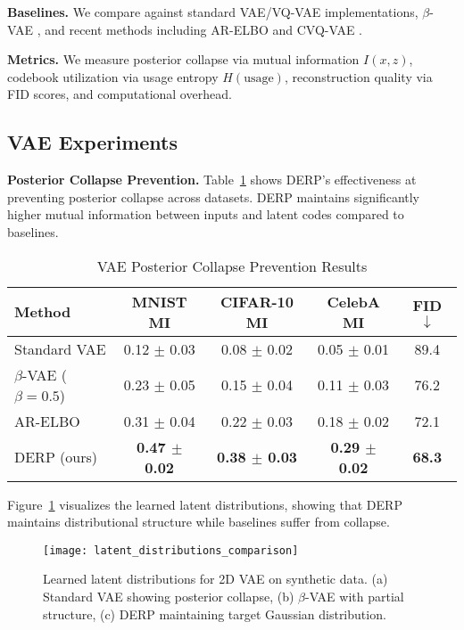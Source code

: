 \documentclass{article}
\begin{document}
\textbf{Baselines.} We compare against standard VAE/VQ-VAE implementations, $\beta$-VAE \citep{higgins2017beta}, and recent methods including AR-ELBO \citep{takida2022preventing} and CVQ-VAE \citep{zheng2023online}.

\textbf{Metrics.} We measure posterior collapse via mutual information $I(x,z)$, codebook utilization via usage entropy $H(\text{usage})$, reconstruction quality via FID scores, and computational overhead.

\subsection{VAE Experiments}

\textbf{Posterior Collapse Prevention.} Table~\ref{tab:vae_results} shows DERP's effectiveness at preventing posterior collapse across datasets. DERP maintains significantly higher mutual information between inputs and latent codes compared to baselines.

\begin{table}[t]
\caption{VAE Posterior Collapse Prevention Results}
\label{tab:vae_results}
\centering
\begin{tabular}{lcccc}
\toprule
Method & MNIST MI & CIFAR-10 MI & CelebA MI & FID $\downarrow$ \\
\midrule
Standard VAE & 0.12 $\pm$ 0.03 & 0.08 $\pm$ 0.02 & 0.05 $\pm$ 0.01 & 89.4 \\
$\beta$-VAE ($\beta=0.5$) & 0.23 $\pm$ 0.05 & 0.15 $\pm$ 0.04 & 0.11 $\pm$ 0.03 & 76.2 \\
AR-ELBO & 0.31 $\pm$ 0.04 & 0.22 $\pm$ 0.03 & 0.18 $\pm$ 0.02 & 72.1 \\
DERP (ours) & \textbf{0.47 $\pm$ 0.02} & \textbf{0.38 $\pm$ 0.03} & \textbf{0.29 $\pm$ 0.02} & \textbf{68.3} \\
\bottomrule
\end{tabular}
\end{table}

Figure~\ref{fig:latent_distributions} visualizes the learned latent distributions, showing that DERP maintains distributional structure while baselines suffer from collapse.

\begin{figure}[t]
\centering
\texttt{[image: latent\_distributions\_comparison]}
\caption{Learned latent distributions for 2D VAE on synthetic data. (a) Standard VAE showing posterior collapse, (b) $\beta$-VAE with partial structure, (c) DERP maintaining target Gaussian distribution.}
\label{fig:latent_distributions}
\end{figure}
\end{document}
